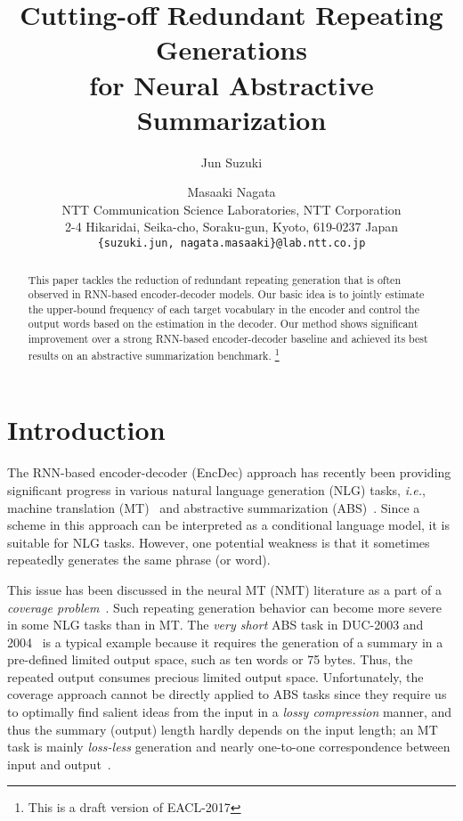 \documentclass[11pt]{article}
\title{Cutting-off Redundant Repeating Generations \\
for Neural Abstractive Summarization
}
\author{Jun Suzuki \and Masaaki Nagata \\
 NTT Communication Science Laboratories, NTT Corporation\\
 2-4 Hikaridai, Seika-cho, Soraku-gun, Kyoto, 619-0237 Japan\\
 {\tt \{suzuki.jun, nagata.masaaki\}@lab.ntt.co.jp} 
}
\date{}
\begin{document}
\maketitle
\begin{abstract}
 This paper tackles the reduction of redundant repeating generation that is often observed in RNN-based encoder-decoder models.
 Our basic idea is to jointly estimate the upper-bound frequency of each target vocabulary in the encoder and control the output words based on the estimation in the decoder.
 Our method shows significant improvement over a strong RNN-based encoder-decoder baseline and achieved its best results on an abstractive summarization benchmark.
 \footnote{This is a draft version of EACL-2017}
\end{abstract}


\section{Introduction}\label{sec:introduction}
   The RNN-based encoder-decoder (EncDec) approach 
   has recently been providing significant progress in various natural language generation (NLG) tasks, {\it i.e.},
   machine translation (MT)~\cite{DBLP:conf/nips/SutskeverVL14,cho-EtAl:2014:EMNLP2014}
   and abstractive summarization (ABS)~\cite{rush-chopra-weston:2015:EMNLP}.
Since a scheme in this approach can be interpreted as a conditional language model, it is suitable for NLG tasks.
However, one potential weakness is that it sometimes repeatedly generates the same phrase (or word).



   This issue has been discussed in the neural MT (NMT) literature as a part of a {\it coverage problem}~\cite{tu-EtAl:2016:P16-1,mi-EtAl:2016:EMNLP2016}.
Such repeating generation behavior can become more severe in some NLG tasks than in MT.
The {\it very short} ABS task in DUC-2003 and 2004~\cite{Over:2007:DC:1284916.1285157} is a typical example
   because it requires the generation of a summary in a pre-defined limited output space, such as ten words or 75 bytes.
Thus, the repeated output consumes precious limited output space.
Unfortunately, the coverage approach cannot be directly applied to ABS tasks
   since they require us to optimally find salient ideas from the input in a {\it lossy compression} manner, and thus the summary (output) length hardly depends on the input length; an MT task is mainly {\it loss-less} generation and nearly one-to-one correspondence between input and output~\cite{DBLP:journals/corr/NallapatiXZ16}. 
 
\end{document}
